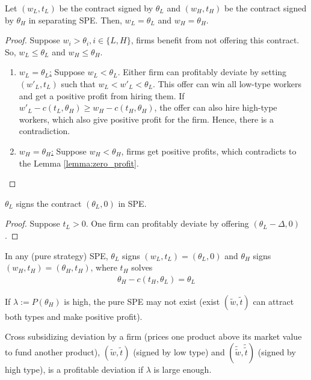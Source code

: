 \documentclass[11pt]{elegantbook}
\begin{document}
\begin{lemma}
    Let $(w_L,t_L)$ be the contract signed by $\theta_L$ and $(w_H,t_H)$ be the contract signed by $\theta_H$ in separating SPE. Then, $w_L=\theta_L$ and $w_H=\theta_H$.
\end{lemma}
\begin{proof}
    Suppose $w_i>\theta_i,i\in\{L,H\}$, firms benefit from not offering this contract. So, $w_L\leq \theta_L$ and $w_H\leq \theta_H$.
    \begin{enumerate}
        \item \underline{$w_L=\theta_L$:} Suppose $w_L<\theta_L$. Either firm can profitably deviate by setting $(w'_L,t_L)$ such that $w_L<w'_L<\theta_L$. This offer can win all low-type workers and get a positive profit from hiring them. If $w'_L-c(t_L,\theta_H)\geq w_H-c(t_H,\theta_H)$, the offer can also hire high-type workers, which also give positive profit for the firm. Hence, there is a contradiction.
        \item \underline{$w_H=\theta_H$:} Suppose $w_H<\theta_H$, firms get positive profits, which contradicts to the Lemma \ref{lemma:zero_profit}.
    \end{enumerate}
\end{proof}

\begin{lemma}
    $\theta_L$ signs the contract $(\theta_L,0)$ in SPE.
\end{lemma}
\begin{proof}
    Suppose $t_L>0$. One firm can profitably deviate by offering $(\theta_L-\Delta,0)$.
\end{proof}

\begin{proposition}
    In any (pure strategy) SPE, $\theta_L$ signs $(w_L,t_L)=(\theta_L,0)$ and $\theta_H$ signs $(w_H,t_H)=(\theta_H,t_H)$, where $t_H$ solves
    \begin{equation}
        \begin{aligned}
            \theta_H-c(t_H,\theta_L)=\theta_L
        \end{aligned}
        \nonumber
    \end{equation}
\end{proposition}

If $\lambda:=P(\theta_H)$ is high, the pure SPE may not exist (exist $(\tilde{w},\tilde{t})$ can attract both types and make positive profit).

Cross subsidizing deviation by a firm (prices one product above its market value to fund another product), $(\tilde{w},\tilde{t})$ (signed by low type) and $(\tilde{\tilde{w}},\tilde{\tilde{t}})$ (signed by high type), is a profitable deviation if $\lambda$ is large enough.
\end{document}
